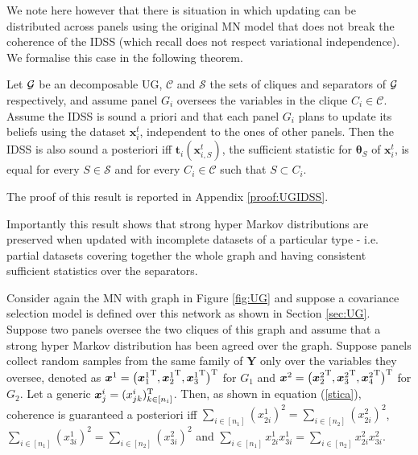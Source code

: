 We note here however that there is situation in which updating can be distributed across panels using the original MN model that does not break the coherence of the IDSS (which recall does not respect variational independence). We formalise this case in the following theorem.

\begin{theorem}
\label{theo:UGIDSS}
Let $\mathcal{G}$ be an decomposable UG, $\mathcal{C}$ and $\mathcal{S}$ the sets of cliques and separators of $\mathcal{G}$ respectively, and assume panel $G_i$ oversees the variables in the clique $C_i\in\mathcal{C}$. Assume the IDSS is sound a priori and that each panel $G_i$ plans to update its beliefs using the dataset  $\bm{x}^t_i$, independent to the ones of other panels. Then the IDSS is also sound a posteriori iff $\bm{t}_i(\bm{x}^t_{i,S})$, the sufficient statistic for $\bm{\theta}_S$ of $\bm{x}^t_i$, is equal for every $S\in\mathcal{S}$ and for every $C_i\in\mathcal{C}$ such that $S\subset C_i$. 
\end{theorem}
The proof of this result is reported in Appendix \ref{proof:UGIDSS}.

Importantly this result shows that strong hyper Markov distributions are preserved when updated with incomplete datasets of a particular type - i.e. partial datasets covering together the whole graph and having consistent sufficient statistics over the separators.  

\begin{example}
Consider again the MN with graph in Figure \ref{fig:UG} and suppose a covariance selection model is defined over this network as shown in Section \ref{sec:UG}. Suppose two panels oversee the two cliques of this graph and assume that a strong hyper Markov distribution has been agreed over the graph. Suppose panels collect random samples from the same family of $\bm{Y}$ only over the variables they oversee, denoted as $\bm{x}^1=\big({\bm{x}_1^1}^{\textnormal{T}},{\bm{x}_2^1}^{\textnormal{T}},{\bm{x}_3^1}^{\textnormal{T}}\big)^{\textnormal{T}}$ for $G_1$ and $\bm{x}^2=\big({\bm{x}_2^2}^{\textnormal{T}},{\bm{x}_3^2}^{\textnormal{T}},{\bm{x}_4^2}^{\textnormal{T}}\big)^{\textnormal{T}}$ for $G_2$. Let a generic $\bm{x}_j^i=(x_{jk}^i)_{k\in[n_i]}^{\textnormal{T}}$. Then, as shown in equation (\ref{stica}), coherence is guaranteed a posteriori iff $\sum_{i\in [n_1]}(x_{2i}^1)^2=\sum_{i\in [n_2]}(x_{2i}^2)^2$, $\sum_{i\in [n_1]}(x_{3i}^1)^2=\sum_{i\in [n_2]}(x_{3i}^2)^2$ and $\sum_{i\in [n_1]}{x_{2i}^1}x_{3i}^1=\sum_{i\in [n_2]}x_{2i}^2x_{3i}^2$.
\end{example}

